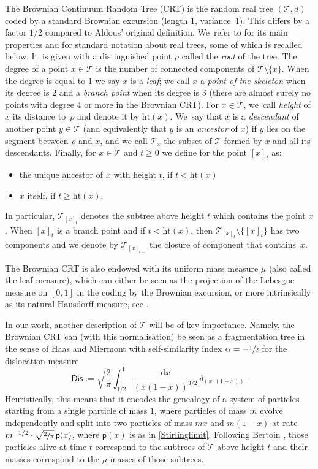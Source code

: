 \documentclass[JEP,XML,SOM,Unicode,NoFloatCountersInSection, NoEqCountersInSection,published]{cedram}
\newcommand{\pp}{\mathsf{p}}
\newcommand{\T}{\mathcal{T}}\let\CRT\T\let\tbr\T
\newcommand{\h}{\mathrm{ht}}
\theoremstyle{definition}
\begin{document}
The Brownian Continuum Random Tree (CRT) is the random real tree $(\mathcal{T}, d)$ coded by a standard Brownian excursion (length $1$, variance~$1$). This differs by a factor $1/2$ compared to Aldous' original definition. We~refer to \cite{LG2005} for its main properties and for standard notation about real trees, some of which is recalled below. It~is given with a distinguished point $ \rho$ called the \emph{root} of the tree. The degree of a point $x \in \mathcal{T}$ is the number of connected components of $\T\setminus \{x\}$. When the degree is equal to $1$ we say $x$ is a \emph{leaf}; we call $x$ a \emph{point of the skeleton} when its degree is $2$ and a \emph{branch point} when its degree is $3$ (there are almost surely no points with degree $4$ or more in the Brownian CRT). For $x\in \T$, we~call \emph{height} of $x$ its distance to~$\rho$ and denote it by $\h(x)$. We~say that $x$ is a \emph{descendant} of another point $y\in\T$ (and equivalently that $y$ is an \emph{ancestor} of $x$) if $y$ lies on the segment between $\rho$ and $x$, and we call $\T_x$ the subset of $\T$ formed by $x$ and all its descendants. Finally, for $x \in \T$ and $t\geq 0$ we define for the point $[x]_t$ as:
\begin{itemize}
\item the unique ancestor of $x$ with height $t$, if $t< \h(x)$
\item $x$ itself, if $t\geq \h(x)$.
\end{itemize}
In particular, $ \T_{[x]_t}$ denotes the subtree above height $t$ which contains the point $x$. When $[x]_t$ is a branch point and if $t < \h(x)$, then $\T_{[x]_t} \setminus \{[x]_t\}$ has two components and we denote by $ \mathcal{T}_{[x]_{t+}}$ the closure of component that contains~$x$.

The Brownian CRT is also endowed with its uniform mass measure $\mu$ (also called the leaf measure), which can either be seen as the projection of the Lebesgue measure on $[0,1]$ in the coding by the Brownian excursion, or more intrinsically as its natural Hausdorff measure, see \cite{duquesne2005probabilistic,duquesne2006hausdorff}.

In our work, another description of $\mathcal{T}$ will be of key importance. Namely, the Brownian CRT can (with this normalisation) be seen as a fragmentation tree in the sense of Haas and Miermont \cite{HM04} with self-similarity index $\alpha = - \sfrac{1}{2}$ for the dislocation measure
\begin{equation}
\label{eq:Dislocation}
\mathsf{Dis} := \sqrt{\frac{2}{\pi}} \int_{1/2}^{1} \frac{ \mathrm{d}x}{(x(1-x))^{3/2}}\, \delta_{(x,(1-x))}.
\end{equation}
Heuristically, this means that it encodes the genealogy of a system of particles starting from a single particle of mass $1$, where particles of mass $m$ evolve independently and split into two particles of mass $mx$ and $m(1-x)$ at rate $m^{-1/2} \cdot \sqrt{\sfrac{2}{\pi}}\, \pp(x)$, where $\pp(x)$ is as in \eqref{Stirlinglimit}. Following Bertoin \cite{bertoin2002self}, those particles alive at time $t$ correspond to the subtrees of $\T$ above height $t$ and their masses correspond to the $\mu$-masses of those subtrees.
\end{document}
